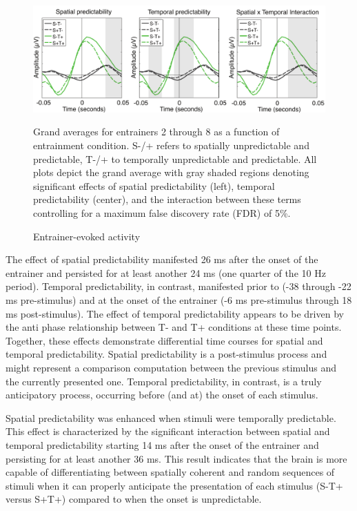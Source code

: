 \documentclass[dwyatte_dissertation.tex]{subfiles}
\begin{document}
\begin{figure}[h!]
\begin{center}
\includegraphics[width=160mm]{figs/pleast/results_entrain_tla_All_montage.pdf}
\end{center}
\caption{Entrainer-evoked activity}{Grand averages for entrainers 2 through 8 as a function of entrainment condition. S-/+ refers to spatially unpredictable and predictable, T-/+ to temporally unpredictable and predictable. All plots depict the grand average with gray shaded regions denoting significant effects of spatial predictability (left), temporal predictability (center), and the interaction between these terms controlling for a maximum false discovery rate (FDR) of 5\%.}
\label{fig:entrain_tla}
\end{figure}

The effect of spatial predictability manifested 26 ms after the onset of the entrainer and persisted for at least another 24 ms (one quarter of the 10 Hz period). Temporal predictability, in contrast, manifested prior to (-38 through -22 ms pre-stimulus) and at the onset of the entrainer (-6 ms pre-stimulus through 18 ms post-stimulus). The effect of temporal predictability appears to be driven by the anti phase relationship between T- and T+ conditions at these time points. Together, these effects demonstrate differential time courses for spatial and temporal predictability. Spatial predictability is a post-stimulus process and might represent a comparison computation between the previous stimulus and the currently presented one. Temporal predictability, in contrast, is a truly anticipatory process, occurring before (and at) the onset of each stimulus. 

Spatial predictability was enhanced when stimuli were temporally predictable. This effect is characterized by the significant interaction between spatial and temporal predictability starting 14 ms after the onset of the entrainer and persisting for at least another 36 ms. This result indicates that the brain is more capable of differentiating between spatially coherent and random sequences of stimuli when it can properly anticipate the presentation of each stimulus (S-T+ versus S+T+) compared to when the onset is unpredictable.
\end{document}
